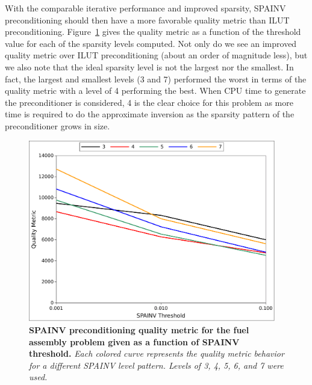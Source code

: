 With the comparable iterative performance and improved sparsity,
SPAINV preconditioning should then have a more favorable quality
metric than ILUT preconditioning. Figure~\ref{fig:spainv_quality}
gives the quality metric as a function of the threshold value for each
of the sparsity levels computed. Not only do we see an improved
quality metric over ILUT preconditioning (about an order of magnitude
less), but we also note that the ideal sparsity level is not the largest
nor the smallest. In fact, the largest and smallest levels (3 and 7)
performed the worst in terms of the quality metric with a level of 4
performing the best. When CPU time to generate the preconditioner is
considered, 4 is the clear choice for this problem as more time is
required to do the approximate inversion as the sparsity pattern of
the preconditioner grows in size.
\begin{figure}[t!]
  \begin{center}
    \includegraphics[width=4.25in]{chapters/spn_equations/spainv_quality.pdf}
  \end{center}
  \caption{\textbf{SPAINV preconditioning quality metric for the fuel
      assembly problem given as a function of SPAINV threshold.}
    \textit{Each colored curve represents the quality metric behavior
      for a different SPAINV level pattern. Levels of 3, 4, 5, 6, and
      7 were used.}}
  \label{fig:spainv_quality}
\end{figure}

\clearpage

